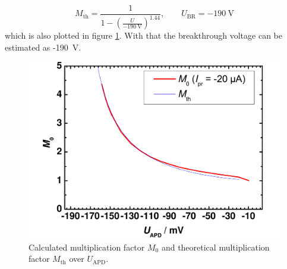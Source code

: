 \begin{equation}
M_{\mathrm{th}} = \frac{1}{1-(\frac{U}{-190~\mathrm{V}})^{1.44}},\qquad U_{\mathrm{BR}}=-190~\mathrm{V}
\label{eq:M_fit}
\end{equation}
which is also plotted in figure \ref{fig:T3_3}.
With that the breakthrough voltage can be estimated as -190~V.

\begin{figure}%
\centering
\includegraphics[width=.5\columnwidth]{Grafiken/T3_3.pdf}%
\caption{Calculated multiplication factor $M_0$ and theoretical multiplication factor $M_{\mathrm{th}}$ over $U_{\mathrm{APD}}$.}%
\label{fig:T3_3}%
\end{figure}